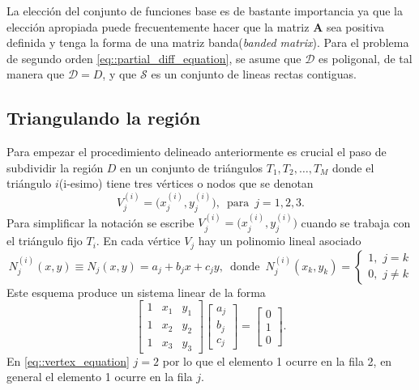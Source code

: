 \documentclass[a4paper]{article}
\begin{document}
La elección del conjunto de funciones base es de bastante importancia ya que la elección apropiada puede frecuentemente hacer que la matriz $\mathbf{A}$ sea positiva definida y tenga la forma de una matriz banda(\textit{banded matrix}). Para el problema de segundo orden \ref{eq::partial_diff_equation}, se asume que $\mathcal{D}$ es poligonal, de tal manera que $\mathcal{D}=D$, y que $\mathcal{S}$ es un conjunto de lineas rectas contiguas.

\subsection{Triangulando la región}
Para empezar el procedimiento delineado anteriormente es crucial el paso de subdividir la región $D$ en un conjunto de triángulos  $T_1,T_2,\hdots,T_M$ donde el triángulo $i$(i-esimo) tiene tres vértices o nodos que se denotan 
\begin{equation}\label{eq::triangle_vertex}
V_j^{(i)}=\big( x_j^{(i)},y_j^{(i)} \big),\,\,\, \text{para }\, j=1,2,3.
\end{equation}
Para simplificar la notación se escribe $V^{(i)}_j=\big(x_j^{(i)},y_j^{(i)})$ cuando se trabaja con el triángulo fijo $T_i$. En cada vértice $V_j$ hay un polinomio lineal asociado
\begin{equation}
N_j^{(i)}(x,y)\equiv N_j(x,y)=a_j+b_jx+c_jy,\,\,\,\text{donde }\, N_j^{(i)}(x_k,y_k)=
\begin{cases}
1, \,\,j=k\\
0, \,\,j\neq k
\end{cases}
\end{equation}
Este esquema produce un sistema linear de la forma
\begin{equation}\label{eq::vertex_equation}
\begin{bmatrix}
1 & x_1 & y_1\\
1 & x_2 & y_2\\
1 & x_3 & y_3
\end{bmatrix}
\begin{bmatrix}
a_j\\
b_j\\
c_j
\end{bmatrix}=
\begin{bmatrix}
0\\
1\\
0
\end{bmatrix}.
\end{equation}
En \ref{eq::vertex_equation} $j=2$ por lo que el elemento 1 ocurre en la fila 2, en general el elemento 1 ocurre en la fila $j$.\\
\end{document}
